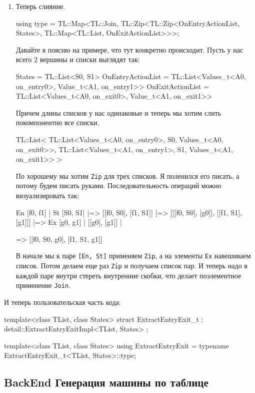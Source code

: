 \documentclass{article}
\begin{document}
{\begin{enumerate}
\item Теперь слияние.
\begin{cppcode}[\nonumbers]
using type = TL::Map<TL::Join, TL::Zip<TL::Zip<OnEntryActionList, States>,
                                       TL::Map<TL::List, OnExitActionList>>>;
\end{cppcode}
Давайте я поясню на примере, что тут конкретно происходит.
Пусть у нас всего $2$ вершины и списки выглядят так:
\begin{cppcode}[\nonumbers]
States            = TL::List<S0, S1>
OnEntryActionList = TL::List<Values_t<A0, on_entry0>, Value_t<A1, on_entry1>>
OnExitActionList  = TL::List<Values_t<A0, on_exit0>,  Value_t<A1, on_exit1>>
\end{cppcode}
Причем длины списков у нас одинаковые и теперь мы хотим слить покомпонентно все списки.
\begin{cppcode}[\nonumbers]
TL::List<
    TL::List<Values_t<A0, on_entry0>, S0, Values_t<A0, on_exit0>>,
    TL::List<Values_t<A1, on_entry1>, S1, Values_t<A1, on_exit1>>
>
\end{cppcode}
По хорошему мы хотим \verb"Zip" для трех списков.
Я поленился его писать, а потому будем писать руками.
Последовательность операций можно визуализировать так:
\begin{cppcode}[\nonumbers]
En [f0, f1] |   
St [S0, S1] |=> [[f0, S0], [f1, S1]] |=> [[[f0, S0], [g0]], [[f1, S1], [g1]]] |=>
Ex [g0, g1] |   [[g0], [g1]]         |

=> [[f0, S0, g0], [f1, S1, g1]]
\end{cppcode}
В начале мы к паре \verb"[En, St]" применяем \verb"Zip", а на элементы \verb"Ex" навешиваем список.
Потом делаем еще раз \verb"Zip" и получаем список пар.
И теперь надо в каждой паре внутри стереть внутренние скобки, что делает поэлементное применение \verb"Join".
\end{enumerate}
И теперь пользовательская часть кода:
\begin{cppcode}
template<class TList, class States>
struct ExtractEntryExit_t : detail::ExtractEntryExitImpl<TList, States> {};

template<class TList, class States>
using ExtractEntryExit = typename ExtractEntryExit_t<TList, States>::type;
\end{cppcode}

\subsection{BackEnd Генерация машины по таблице}


}
\end{document}
